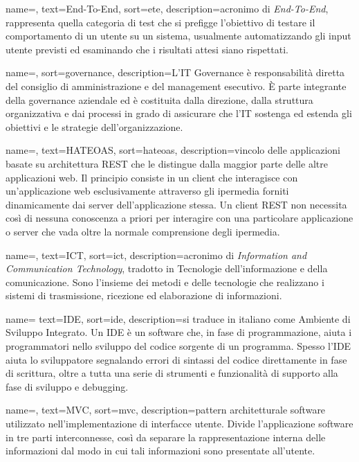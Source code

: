 {
	name=,
	text=End-To-End,
	sort=ete,
	description={acronimo di \emph{End-To-End}, rappresenta quella categoria di test che si prefigge l'obiettivo di testare il comportamento di un utente su un sistema, usualmente automatizzando gli input utente previsti ed esaminando che i risultati attesi siano rispettati.}
}

{
	name=,
	sort=governance,
	description={L'IT Governance è responsabilità diretta del consiglio di amministrazione e del management esecutivo. \`{E} parte integrante della governance aziendale ed è costituita dalla direzione, dalla struttura organizzativa e dai processi in grado di assicurare che l'IT sostenga ed estenda gli obiettivi e le strategie dell'organizzazione.}
}

{
	name=,
	text=HATEOAS,
	sort=hateoas,
	description={vincolo delle applicazioni basate su architettura REST che le distingue dalla maggior parte delle altre applicazioni web. Il principio consiste in un client che interagisce con un'applicazione web esclusivamente attraverso gli ipermedia forniti dinamicamente dai server dell'applicazione stessa. Un client REST non necessita così di nessuna conoscenza a priori per interagire con una particolare applicazione o server che vada oltre la normale comprensione degli ipermedia.}
}

{
	name=,
	text=ICT,
	sort=ict,
	description={acronimo di \emph{Information and Communication Technology}, tradotto in Tecnologie dell’informazione e della comunicazione. Sono l'insieme dei metodi e delle tecnologie che realizzano i sistemi di trasmissione, ricezione ed elaborazione di informazioni.}
}

{
	name=
	text=IDE,
	sort=ide,
	description={si traduce in italiano come Ambiente di Sviluppo Integrato. Un IDE è un software che, in fase di programmazione, aiuta i programmatori nello sviluppo del codice sorgente di un programma. Spesso l'IDE aiuta lo sviluppatore segnalando errori di sintassi del codice direttamente in fase di scrittura, oltre a tutta una serie di strumenti e funzionalità di supporto alla fase di sviluppo e debugging.}
}

{
	name=,
	text=MVC,
	sort=mvc,
	description={pattern architetturale software utilizzato nell'implementazione di interfacce utente. Divide l'applicazione software in tre parti interconnesse, così da separare la rappresentazione interna delle informazioni dal modo in cui tali informazioni sono presentate all'utente.}
}


